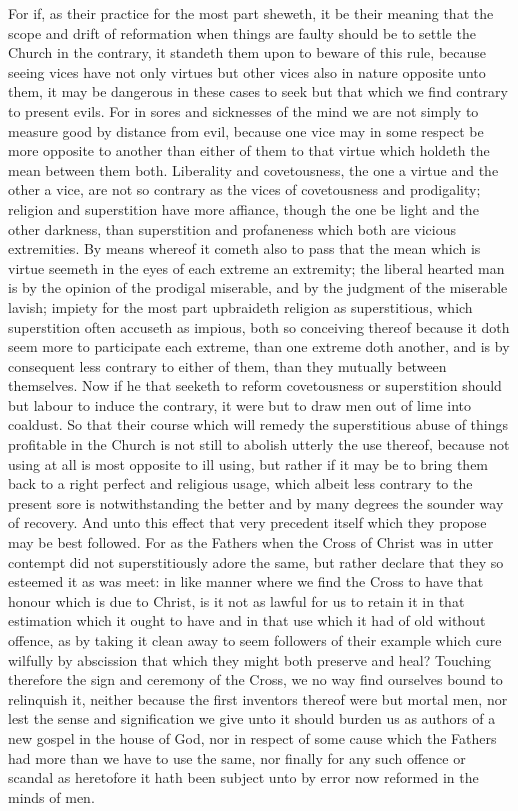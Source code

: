 For if, as their practice for the most part sheweth, it be their meaning that the scope and drift of reformation when things are faulty should be to settle the Church in the contrary, it standeth them upon to beware of this rule, because seeing vices have not only virtues but other vices also in nature opposite unto them, it may be dangerous in these cases to seek but that which we find contrary to present evils. For in sores and sicknesses of the mind we are not simply to measure good by distance from evil, because one vice may in some respect be more opposite to another than either of them to that virtue which holdeth the mean between them both. Liberality and covetousness, the one a virtue and the other a vice, are not so contrary as the vices of covetousness and prodigality; religion and superstition have more affiance, though the one be light and the other darkness, than superstition and profaneness which both are vicious extremities. By means whereof it cometh also to pass that the mean which is virtue seemeth in the eyes of each extreme an extremity; the liberal hearted man is by the opinion of the prodigal miserable, and by the judgment of the miserable lavish; impiety for the most part upbraideth religion as superstitious, which superstition often accuseth as impious, both so conceiving thereof because it doth seem more to participate each extreme, than one extreme doth another, and is by consequent less contrary to either of them, than they mutually between themselves. Now if he that seeketh to reform covetousness or superstition should but labour to induce the contrary, it were but to draw men out of lime into coaldust. So that their course which will remedy the superstitious abuse of things profitable in the Church is not still to abolish utterly the use thereof, because not using at all is most opposite to ill using, but rather if it may be to bring them back to a right perfect and religious usage, which albeit less contrary to the present sore is notwithstanding the better and by many degrees the sounder way of recovery.
And unto this effect that very precedent itself which they propose may be best followed. For as the Fathers when the Cross of Christ was in utter contempt did not superstitiously adore the same, but rather declare that they so esteemed it as was meet: in like manner where we find the Cross to have that honour which is due to Christ, is it not as lawful for us to  retain it in that estimation which it ought to have and in that use which it had of old without offence,
 as by taking it clean away to seem followers of their example which cure wilfully by abscission that which they might both preserve and heal?
Touching therefore the sign and ceremony of the Cross, we no way find ourselves bound to relinquish it, neither because the first inventors thereof were but mortal men, nor lest the sense and signification we give unto it should burden us as authors of a new gospel in the house of God, nor in respect of some cause which the Fathers had more than we have to use the same, nor finally for any such offence or scandal as heretofore it hath been subject unto by error now reformed in the minds of men.


